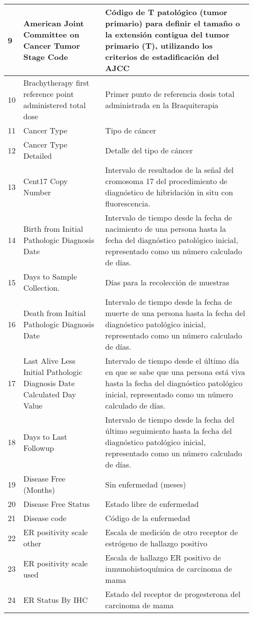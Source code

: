 \begin{table*} [!htb]
\begin{threeparttable}
\begin{tabular}{p{1cm} p{4cm} p{10cm}}
			\\ \hline	9	&	American Joint Committee on Cancer Tumor Stage Code	&	Código de T patológico (tumor primario) para definir el tamaño o la extensión contigua del tumor primario (T), utilizando los criterios de estadificación del AJCC
			\\ \hline	10	&	Brachytherapy first reference point administered total dose	&	Primer punto de referencia dosis total administrada en la Braquiterapia
			\\ \hline	11	&	Cancer Type	&	Tipo de cáncer
			\\ \hline	12	&	Cancer Type Detailed	&	Detalle del tipo de cáncer
			\\ \hline	13	&	Cent17 Copy Number	&	Intervalo de resultados de la señal del cromosoma 17 del procedimiento de diagnóstico de hibridación in situ con fluorescencia.
			\\ \hline	14	&	Birth from Initial Pathologic Diagnosis Date	&	Intervalo de tiempo desde la fecha de nacimiento de una persona hasta la fecha del diagnóstico patológico inicial, representado como un número calculado de días.
			\\ \hline	15	&	Days to Sample Collection.	&	Días para la recolección de muestras
			\\ \hline	16	&	Death from Initial Pathologic Diagnosis Date	&	Intervalo de tiempo desde la fecha de muerte de una persona hasta la fecha del diagnóstico patológico inicial, representado como un número calculado de días.
			\\ \hline	17	&	Last Alive Less Initial Pathologic Diagnosis Date Calculated Day Value	&	Intervalo de tiempo desde el último día en que se sabe que una persona está viva hasta la fecha del diagnóstico patológico inicial, representado como un número calculado de días.
			\\ \hline	18	&	Days to Last Followup	&	Intervalo de tiempo desde la fecha del último seguimiento hasta la fecha del diagnóstico patológico inicial, representado como un número calculado de días.
			\\ \hline	19	&	Disease Free (Months)	&	Sin enfermedad (meses)
			\\ \hline	20	&	Disease Free Status	&	Estado libre de enfermedad
			\\ \hline	21	&	Disease code	&	Código de la enfermedad
			\\ \hline	22	&	ER positivity scale other	&	Escala de medición de otro receptor de estrógeno de hallazgo positivo
			\\ \hline	23	&	ER positivity scale used	&	Escala de hallazgo ER positivo de inmunohistoquímica de carcinoma de mama
			\\ \hline	24	&	ER Status By IHC	&	Estado del receptor de progesterona del carcinoma de mama
			\\ \hline
		\end{tabular}
	\end{threeparttable}
\end{table*}

